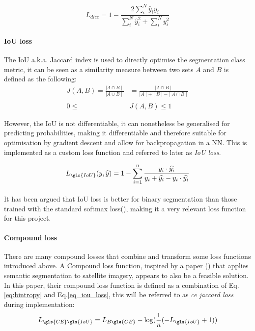 \begin{equation}\label{eq_dice_loss}
L_{dice}=1-\frac{2\sum_{{i}}^{N}\widehat{y}_{i}y_{i}}{\sum_{i}^{N}\widehat{y}_{i}^{2}+\sum_{i}^{N}y_{{i}}^{2}}
\end{equation}

\paragraph{\gls{IoU} loss}
The \gls{IoU} \gls{a.k.a.} Jaccard index is used to directly optimise the segmentation class metric, it can be seen as a similarity measure between two sets $A$ and $B$ is defined as the following:
\begin{equation}
\label{eq_jaccard}
\begin{aligned}
J(A, B) = \frac{\mid A \cap B \mid }{\mid A \cup B \mid} &= \frac{\mid A \cap B \mid}{\mid A \mid + \mid B \mid - \mid A \cap B \mid} \\ \\
0 \le & J(A, B) \le 1
\end{aligned}
\end{equation}

However, the \gls{IoU} is not differentiable, it can nonetheless be generalised for predicting probabilities, making it differentiable and therefore suitable for optimisation by gradient descent and allow for backpropagation in a \gls{NN}. This is implemented as a custom loss function and referred to later as \textit{\gls{IoU} loss}.

\begin{equation} \label{eq_iou_loss}
L_{\gls{IoU}}(y, \widehat{y}) = 1- \sum_{i=1}^n \frac{y_i \cdot \widehat{y_i}}{y_i + \widehat{y_i} - y_i \cdot \widehat{y_i}}
\end{equation}
\paragraph{}
It has been argued that \gls{IoU} loss is better for binary segmentation than those trained with the standard softmax loss(\cite{Rahman_2016}), making it a very relevant loss function for this project.
\paragraph{Compound loss}
There are many compound losses that combine and transform some loss functions introduced above. A Compound loss function, inspired by a paper (\cite{DBLP:journals/corr/IglovikovMO17}) that applies semantic segmentation to satellite imagery, appears to also be a feasible solution.
In this paper, their compound loss function is defined as a combination of Eq.\ref{eq:bintropy} and Eq.\ref{eq_iou_loss}, this will be referred to as \textit{ce jaccard loss} during implementation:
\begin{equation}
L_{\gls{CE} \gls{IoU}} = L_{B\gls{CE}} - \log (\frac{1}{n} (-L_{\gls{IoU}}+1))
\end{equation}

